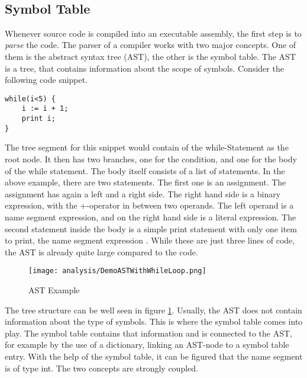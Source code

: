 \\


\subsection{Symbol Table}
Whenever source code is compiled into an executable assembly, the first step is to \textit{parse} the code.
The parser of a compiler works with two major concepts.
One of them is the abstract syntax tree (AST), the other is the symbol table.
The AST is a tree, that contains information about the scope of symbols.
Consider the following code snippet.

\begin{lstlisting}[language=dafny, caption={AST Demo Snippet}, captionpos=b, label={lst:astsnipped}]
while(i<5) {
    i := i + 1;
    print i;
}
\end{lstlisting}

The tree segment for this snippet would contain of the while-Statement as the root node.
It then has two branches, one for the condition, and one for the body of the while statement.
The body itself consists of a list of statements.
In the above example, there are two statements.
The first one is an assignment.
The assignment has again a left and a right side.
The right hand side is a binary expression, with the +-operator in between two operands.
The left operand is a name segment expression, and on the right hand side is a literal expression.
The second statement inside the body is a simple print statement with only one item to print, the name segment expression .
While these are just three lines of code, the AST is already quite large compared to the code.\\

\begin{figure}[h]
    \centering
    \texttt{[image: analysis/DemoASTWithWhileLoop.png]}
    \caption{AST Example}
    \label{fig:ast_for_example}
\end{figure}

The tree structure can be well seen in figure \ref{fig:ast_for_example}.
Usually, the AST does not contain information about the type of symbols.
This is where the symbol table comes into play.
The symbol table contains that information and is connected to the AST, for example by the use of a dictionary, linking an AST-node to a symbol table entry.
With the help of the symbol table, it can be figured that the name segment  is of type int.
The two concepts are strongly coupled.

